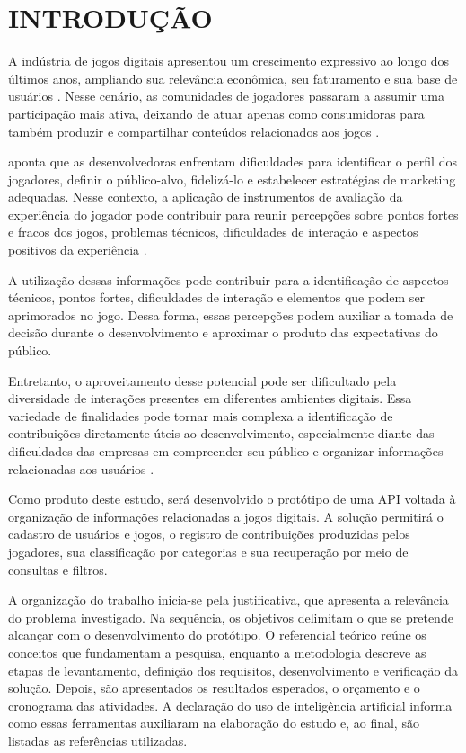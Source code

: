 \chapter{INTRODUÇÃO}

A indústria de jogos digitais apresentou um crescimento expressivo ao longo dos últimos anos, ampliando sua relevância econômica, seu faturamento e sua base de usuários \cite{mbakirtzis2023analise}. Nesse cenário, as comunidades de jogadores passaram a assumir uma participação mais ativa, deixando de atuar apenas como consumidoras para também produzir e compartilhar conteúdos relacionados aos jogos \cite{soares2019jogos}.

 aponta que as desenvolvedoras enfrentam dificuldades para identificar o perfil dos jogadores, definir o público-alvo, fidelizá-lo e estabelecer estratégias de marketing adequadas. Nesse contexto, a aplicação de instrumentos de avaliação da experiência do jogador pode contribuir para reunir percepções sobre pontos fortes e fracos dos jogos, problemas técnicos, dificuldades de interação e aspectos positivos da experiência \cite{pinto2024avaliacao}.

A utilização dessas informações pode contribuir para a identificação de aspectos técnicos, pontos fortes, dificuldades de interação e elementos que podem ser aprimorados no jogo. Dessa forma, essas percepções podem auxiliar a tomada de decisão durante o desenvolvimento e aproximar o produto das expectativas do público.

Entretanto, o aproveitamento desse potencial pode ser dificultado pela diversidade de interações presentes em diferentes ambientes digitais. Essa variedade de finalidades pode tornar mais complexa a identificação de contribuições diretamente úteis ao desenvolvimento, especialmente diante das dificuldades das empresas em compreender seu público e organizar informações relacionadas aos usuários \cite{fortim2022pesquisa}.

Como produto deste estudo, será desenvolvido o protótipo de uma API voltada à organização de informações relacionadas a jogos digitais. A solução permitirá o cadastro de usuários e jogos, o registro de contribuições produzidas pelos jogadores, sua classificação por categorias e sua recuperação por meio de consultas e filtros.

A organização do trabalho inicia-se pela justificativa, que apresenta a relevância do problema investigado. Na sequência, os objetivos delimitam o que se pretende alcançar com o desenvolvimento do protótipo. O referencial teórico reúne os conceitos que fundamentam a pesquisa, enquanto a metodologia descreve as etapas de levantamento, definição dos requisitos, desenvolvimento e verificação da solução. Depois, são apresentados os resultados esperados, o orçamento e o cronograma das atividades. A declaração do uso de inteligência artificial informa como essas ferramentas auxiliaram na elaboração do estudo e, ao final, são listadas as referências utilizadas.